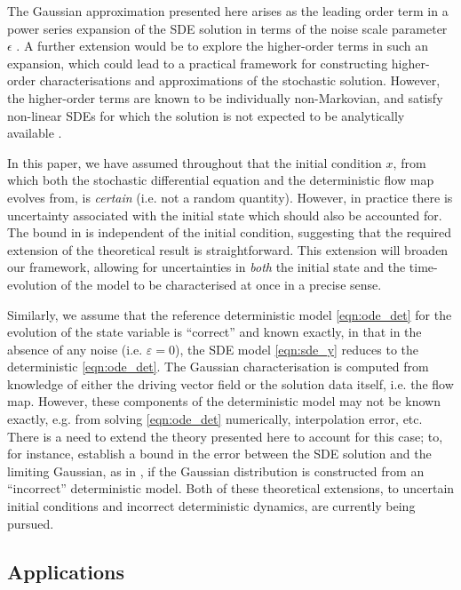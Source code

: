 The Gaussian approximation presented here arises as the leading order term in a power series expansion of the SDE solution in terms of the noise scale parameter \(\epsilon\) \cite{Blagoveshchenskii_1962_DiffusionProcessesDepending}.
A further extension would be to explore the higher-order terms in such an expansion, which could lead to a practical framework for constructing higher-order characterisations and approximations of the stochastic solution.
However, the higher-order terms are known to be individually non-Markovian, and satisfy non-linear SDEs for which the solution is not expected to be analytically available \cite{Blagoveshchenskii_1962_DiffusionProcessesDepending}.

In this paper, we have assumed throughout that the initial condition \(x\), from which both the stochastic differential equation and the deterministic flow map evolves from, is \emph{certain} (i.e. not a random quantity).
However, in practice there is uncertainty associated with the initial state which should also be accounted for.
The bound in  is independent of the initial condition, suggesting that the required extension of the theoretical result is straightforward.
This extension will broaden our framework, allowing for uncertainties in \emph{both} the initial state and the time-evolution of the model to be characterised at once in a precise sense.

Similarly, we assume that the reference deterministic model \eqref{eqn:ode_det} for the evolution of the state variable is ``correct'' and known exactly, in that in the absence of any noise (i.e. \(\varepsilon = 0\)), the SDE model \eqref{eqn:sde_y} reduces to the deterministic \eqref{eqn:ode_det}.
The Gaussian characterisation is computed from knowledge of either the driving vector field or the solution data itself, i.e. the flow map.
However, these components of the deterministic model may not be known exactly, e.g. from solving \eqref{eqn:ode_det} numerically, interpolation error, etc.
There is a need to extend the theory presented here to account for this case; to, for instance, establish a bound in the error between the SDE solution and the limiting Gaussian, as in , if the Gaussian distribution is constructed from an ``incorrect'' deterministic model.
Both of these theoretical extensions, to uncertain initial conditions and incorrect deterministic dynamics, are currently being pursued.


\subsection{Applications}

